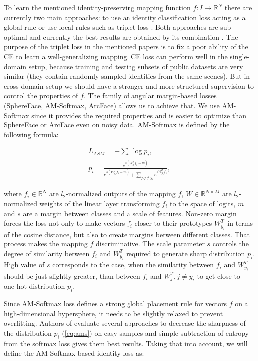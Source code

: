 \documentclass[a4paper,conference]{IEEEtran}
\begin{document}
To learn the mentioned identity-preserving mapping function $f:I\to\mathbb{R}^N$
there are currently two main approaches: to use an identity classification loss
\cite{zheng2016person, Xiao2016LearningDF} acting as a global rule or use local rules such as triplet
loss \cite{inDefenceTriplet1, inDefenceTriplet2}. Both approaches are
sub-optimal and currently the best results are obtained by its combination
\cite{mgn, abd, Luo2019BagOT}. The purpose of the triplet loss in the mentioned
papers is to fix a poor ability of the CE to learn a well-generalizing mapping.
CE loss can perform well in the single-domain setup, because training and
testing subsets of public datasets \cite{market, duke2, MSMT17} are very similar
(they contain randomly sampled identities from the same scenes).  But in cross
domain setup we should have a stronger and more structured supervision to
control the properties of $f$. The family of angular margin-based losses
(SphereFace\cite{Liu2017SphereFaceDH}, AM-Softmax\cite{amSoftmax},
ArcFace\cite{deng2018arcface}) allows us to achieve that. We use AM-Softmax
since it provides the required properties and is easier to
optimize than SphereFace or ArcFace even on noisy data.  AM-Softmax is defined
by the following formula:


\begin{gather}
    L_{ASM} = -\sum_i \log p_i, \\
    p_i=\frac{e^{s(W^T_{y_i}f_i-m)} }{e^{s(W^T_{y_i}f_i-m)} + \sum_{j,j\ne y_i}e^{sW^T_{y_j}f_j} },
    \label{eq:ams}
\end{gather}

where $f_i\in\mathbb{R}^N$ are $l_2$-normalized outputs of the mapping $f$,
$W\in\mathbb{R}^{N\times M}$ are $l_2$-normalized weights of the linear layer
transforming $f_i$ to the space of logits, $m$ and $s$ are a margin between
classes and a scale of features.  Non-zero margin forces the loss not only to
make vectors $f_i$ closer to their prototypes $W^T_{y_i}$ in terms of the cosine
distance, but also to create margins between different classes. That process
makes the mapping $f$ discriminative. The scale parameter $s$ controls the degree of similarity
between $f_i$ and $W^T_{y_i}$ required to generate sharp distribution $p_i$.
High value of $s$ corresponds to the case, when the similarity between $f_i$ and $W^T_{y_i}$
should be just slightly greater, than between $f_i$ and $W^T_j,j\ne y_i$ to get close to one-hot distribution $p_i$.

Since AM-Softmax loss defines a strong global placement rule for vectors $f$ on
a high-dimensional hypersphere, it needs to be slightly relaxed to prevent
overfitting. Authors of \cite{Adaimi2019RethinkingPR} evaluate several
approaches to decrease the sharpness of the distribution $p_i$ (\ref{eq:ams}) on easy samples
and simple subtraction of entropy from the softmax loss gives them best
results. Taking that into account, we will define the AM-Softmax-based identity
loss as:
\end{document}
